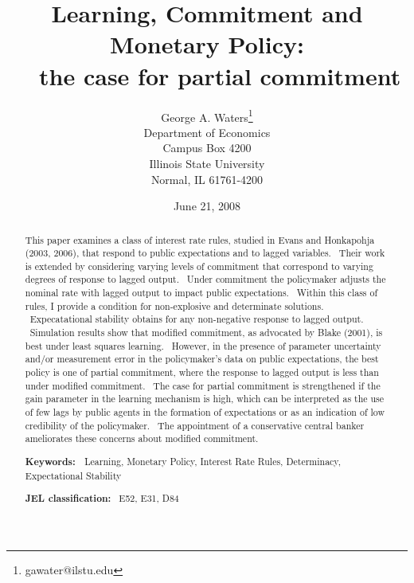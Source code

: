 \documentclass{article}
\begin{document}
\title{\textsf{Learning, Commitment and Monetary Policy:}\\
\textsf{\ \ the case for partial commitment}}
\author{\textsf{George A. Waters\thanks{%
gawater@ilstu.edu}} \\
\textsf{Department of Economics}\\
\textsf{Campus Box 4200}\\
\textsf{Illinois State University}\\
\textsf{Normal, IL 61761-4200}}
\date{\textsf{June 21, 2008}}
\maketitle

\begin{abstract}
This paper examines a class of interest rate rules, studied in Evans and
Honkapohja (2003, 2006), that respond to public expectations and to lagged
variables. \ Their work is extended by considering varying levels of
commitment that correspond to varying degrees of response to lagged output.
\ Under commitment the policymaker adjusts the nominal rate with lagged
output to impact public expectations. \ Within this class of rules, I
provide a condition for non-explosive and determinate solutions. \
Expecatational stability obtains for any non-negative response to lagged
output. \ Simulation results show that modified commitment, as advocated by
Blake (2001), is best under least squares learning. \ However, in the
presence of parameter uncertainty and/or measurement error in the
policymaker's data on public expectations, the best policy is one of partial
commitment, where the response to lagged output is less than under modified
commitment. \ The case for partial commitment is strengthened if the gain
parameter in the learning mechanism is high, which can be interpreted as the
use of few lags by public agents in the formation of expectations or as an
indication of low credibility of the policymaker. \ The appointment of a
conservative central banker ameliorates these concerns about modified
commitment.

\textbf{Keywords: \ }Learning, Monetary Policy, Interest Rate Rules,
Determinacy, Expectational Stability

\textbf{JEL classification:} \ E52, E31, D84
\end{abstract}

\pagebreak
\end{document}
